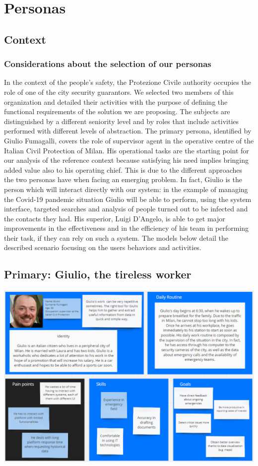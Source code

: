 \documentclass[../main.tex]{subfiles}
\begin{document}
    \chapter{Personas}\label{ch:topic}

    \section{Context}\label{sec:introduction}
    \subsection{Considerations about the selection of our personas}
    In the context of the people’s safety, the Protezione Civile authority occupies the role of one of the city security guarantors. We selected two members of this organization and detailed their activities with the purpose of defining the functional requirements of the solution we are proposing. The subjects are distinguished by a different seniority level and by roles that include activities performed with different levels of abstraction. 
    The primary persona, identified by Giulio Fumagalli, covers the role of supervisor agent in the operative centre of the Italian Civil Protection of Milan. His operational tasks are the starting point for our analysis of the reference context because satisfying his need implies bringing added value also to his operating chief. This is due to the different approaches the two personas have when facing an emerging problem. In fact, Giulio is the person which will interact directly with our system: in the example of managing the Covid-19 pandemic situation Giulio will be able to perform, using the system interface, targeted searches and analysis of people turned out to be infected and the contacts they had. His superior, Luigi D’Angelo, is able to get major improvements in the effectiveness and in the efficiency of his team in performing their task, if they can rely on such a system. The models below detail the described scenario focusing on the users behaviors and activities.



    \section{Primary: Giulio, the tireless worker}\label{sec:primary-persona}
    \includegraphics[scale = 0.45]{assets/primary.png}
\end{document}

